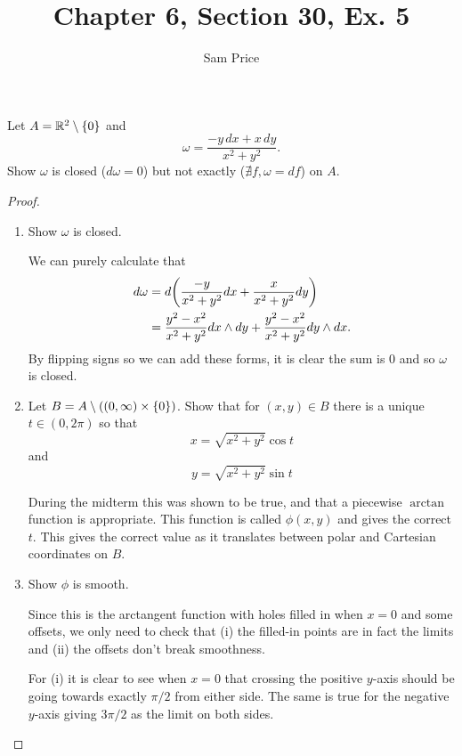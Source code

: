 \documentclass{article}
\author{Sam Price}
\title{Chapter 6, Section 30, Ex. 5}
\begin{document}
\maketitle

\begin{theorem}{}{}
  Let $A = \RR[2] \setminus \set{0}$ and
  \[ \omega = \frac{-y\, dx + x \, dy}{x^{2} + y^{2}}. \]
  Show $\omega$ is closed ($d\omega = 0$) but not exactly ($\nexists f, \omega = df$) on $A$.
\end{theorem}

\begin{proof}

\begin{enumerate}[start=1,label={(\alph*)}]
  \item Show $\omega$ is closed.

        We can purely calculate that
        \begin{align*}
          d\omega &= d\pars*{\frac{-y}{x^{2} + y^{2}} dx + \frac{x}{x^{2} + y^{2}} dy}\\
          &= \frac{y^{2} - x^{2}}{x^{2} + y^{2}} dx \wedge dy
            + \frac{y^{2} - x^{2}}{x^{2} + y^{2}} dy \wedge dx.
        \end{align*}
        By flipping signs so we can add these forms, it is clear the sum is 0 and
        so $\omega$ is closed.

  \item Let $B = A \setminus ((0, \infty) \times \set{0})$.
        Show that for $(x, y) \in B$ there is a unique $t \in (0, 2\pi)$ so that
        \[ x = \sqrt{x^{2} + y^{2}} \cos t \]
        and \[ y = \sqrt{x^{2} + y^{2}} \sin t \]

        During the midterm this was shown to be true, and that a piecewise $\arctan$ function
        is appropriate. This function is called $\phi(x, y)$ and gives the correct $t$.
        This gives the correct value as it translates between polar and Cartesian coordinates
        on $B$.

  \item Show $\phi$ is smooth.

        Since this is the arctangent function with holes filled in when $x = 0$ and
        some offsets, we only need to check that (i) the filled-in points are in fact the limits
        and (ii) the offsets don't break smoothness.

        For (i) it is clear to see when $x = 0$ that crossing the positive $y$-axis
        should be going towards exactly $\pi/2$ from either side. The same is true for the
        negative $y$-axis giving $3\pi/2$ as the limit on both sides.


\end{enumerate}
\end{proof}
\end{document}
